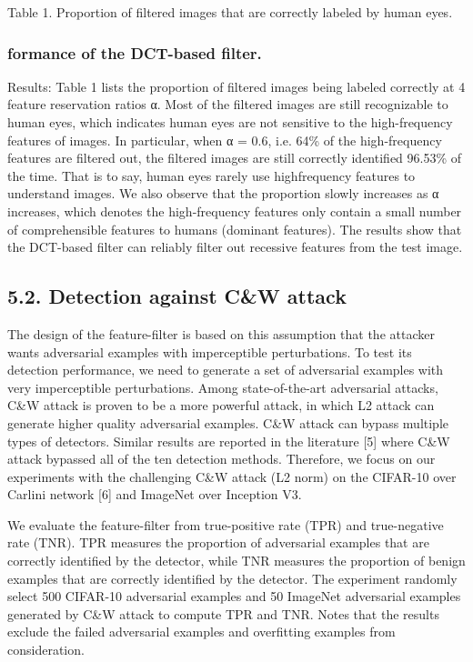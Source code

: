 \documentclass{article}
\begin{document}
Table 1. Proportion of filtered images that are correctly labeled by human eyes.

\subsubsection{formance of the DCT-based filter.}

Results: Table 1 lists the proportion of filtered images being labeled correctly at 4 feature reservation ratios α. Most of the filtered images are still recognizable to human eyes, which indicates human eyes are not sensitive to the high-frequency features of images. In particular, when α = 0.6, i.e. 64\% of the high-frequency features are filtered out, the filtered images are still correctly identified 96.53\% of the time. That is to say, human eyes rarely use highfrequency features to understand images. We also observe that the proportion slowly increases as α increases, which denotes the high-frequency features only contain a small number of comprehensible features to humans (dominant features). The results show that the DCT-based filter can reliably filter out recessive features from the test image.

\subsection{5.2. Detection against C\&W attack}

The design of the feature-filter is based on this assumption that the attacker wants adversarial examples with imperceptible perturbations. To test its detection performance, we need to generate a set of adversarial examples with very imperceptible perturbations. Among state-of-the-art adversarial attacks, C\&W attack is proven to be a more powerful attack, in which L2 attack can generate higher quality adversarial examples. C\&W attack can bypass multiple types of detectors. Similar results are reported in the literature [5] where C\&W attack bypassed all of the ten detection methods. Therefore, we focus on our experiments with the challenging C\&W attack (L2 norm) on the CIFAR-10 over Carlini network [6] and ImageNet over Inception V3.

We evaluate the feature-filter from true-positive rate (TPR) and true-negative rate (TNR). TPR measures the proportion of adversarial examples that are correctly identified by the detector, while TNR measures the proportion of benign examples that are correctly identified by the detector. The experiment randomly select 500 CIFAR-10 adversarial examples and 50 ImageNet adversarial examples generated by C\&W attack to compute TPR and TNR. Notes that the results exclude the failed adversarial examples and overfitting examples from consideration.
\end{document}
